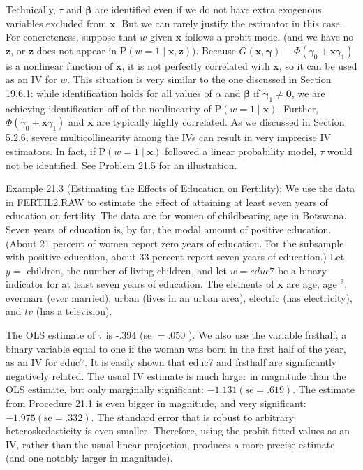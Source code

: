 \documentclass[10pt]{article}
\begin{document}
Technically, $\tau$ and $\boldsymbol{\beta}$ are identified even if we do not have extra exogenous variables excluded from $\mathbf{x}$. But we can rarely justify the estimator in this case. For concreteness, suppose that $w$ given $\mathbf{x}$ follows a probit model (and we have no $\mathbf{z}$, or $\mathbf{z}$ does not appear in $\mathrm{P}(w=1 \mid \mathbf{x}, \mathbf{z}))$. Because $G(\mathbf{x}, \boldsymbol{\gamma}) \equiv \Phi\left(\gamma_{0}+\mathbf{x} \gamma_{1}\right)$ is a nonlinear function of $\mathbf{x}$, it is not perfectly correlated with $\mathbf{x}$, so it can be used as an IV for $w$. This situation is very similar to the one discussed in Section 19.6.1: while identification holds for all values of $\alpha$ and $\boldsymbol{\beta}$ if $\boldsymbol{\gamma}_{1} \neq \mathbf{0}$, we are achieving identification off of the nonlinearity of $\mathrm{P}(w=1 \mid \mathbf{x})$. Further, $\Phi\left(\gamma_{0}+\mathbf{x} \gamma_{1}\right)$ and $\mathbf{x}$ are typically highly correlated. As we discussed in Section 5.2.6, severe multicollinearity among the IVs can result in very imprecise IV estimators. In fact, if $\mathrm{P}(w=1 \mid \mathbf{x})$ followed a linear probability model, $\tau$ would not be identified. See Problem 21.5 for an illustration.

Example 21.3 (Estimating the Effects of Education on Fertility): We use the data in FERTIL2.RAW to estimate the effect of attaining at least seven years of education on fertility. The data are for women of childbearing age in Botswana. Seven years of education is, by far, the modal amount of positive education. (About 21 percent of women report zero years of education. For the subsample with positive education, about 33 percent report seven years of education.) Let $y=$ children, the number of living children, and let $w=e d u c 7$ be a binary indicator for at least seven years of education. The elements of $\mathbf{x}$ are age, age ${ }^{2}$, evermarr (ever married), urban (lives in an urban area), electric (has electricity), and $t v$ (has a television).

The OLS estimate of $\tau$ is -.394 (se $=.050$ ). We also use the variable frsthalf, a binary variable equal to one if the woman was born in the first half of the year, as an IV for educ7. It is easily shown that educ7 and frsthalf are significantly negatively related. The usual IV estimate is much larger in magnitude than the OLS estimate, but only marginally significant: $-1.131(\mathrm{se}=.619)$. The estimate from Procedure 21.1 is even bigger in magnitude, and very significant: $-1.975(\mathrm{se}=.332)$. The standard error that is robust to arbitrary heteroskedasticity is even smaller. Therefore, using the probit fitted values as an IV, rather than the usual linear projection, produces a more precise estimate (and one notably larger in magnitude).
\end{document}
